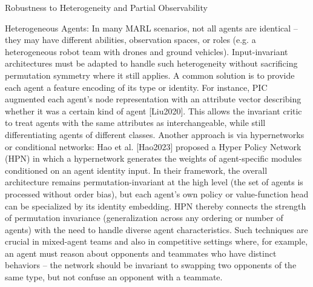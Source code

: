 \documentclass{article}
\begin{document}
Robustness to Heterogeneity and Partial Observability

Heterogeneous Agents: In many MARL scenarios, not all agents are identical – they may have different abilities, observation spaces, or roles (e.g. a heterogeneous robot team with drones and ground vehicles). Input-invariant architectures must be adapted to handle such heterogeneity without sacrificing permutation symmetry where it still applies. A common solution is to provide each agent a feature encoding of its type or identity. For instance, PIC augmented each agent’s node representation with an attribute vector describing whether it was a certain kind of agent [Liu2020]. This allows the invariant critic to treat agents with the same attributes as interchangeable, while still differentiating agents of different classes. Another approach is via hypernetworks or conditional networks: Hao et al. [Hao2023] proposed a Hyper Policy Network (HPN) in which a hypernetwork generates the weights of agent-specific modules conditioned on an agent identity input. In their framework, the overall architecture remains permutation-invariant at the high level (the set of agents is processed without order bias), but each agent’s own policy or value-function head can be specialized by its identity embedding. HPN thereby connects the strength of permutation invariance (generalization across any ordering or number of agents) with the need to handle diverse agent characteristics. Such techniques are crucial in mixed-agent teams and also in competitive settings where, for example, an agent must reason about opponents and teammates who have distinct behaviors – the network should be invariant to swapping two opponents of the same type, but not confuse an opponent with a teammate.
\end{document}
